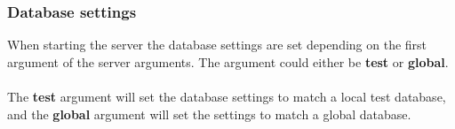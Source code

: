\subsubsection{Database settings}
When starting the server the database settings are set depending on the first argument of the server arguments. The argument could either be \textbf{test} or \textbf{global}.\\\\
The \textbf{test} argument will set the database settings to match a local test database, and the \textbf{global} argument will set the settings to match a global database.

